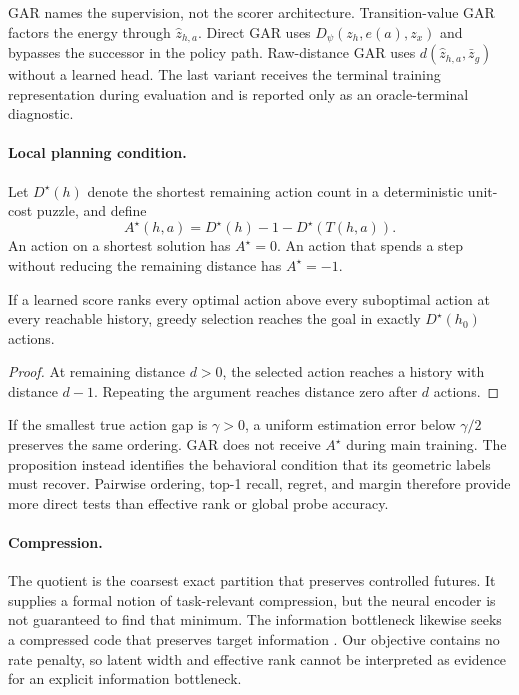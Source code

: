 GAR names the supervision, not the scorer architecture. Transition-value GAR factors the energy through $\widehat z_{h,a}$. Direct GAR uses $D_\psi(z_h,e(a),z_x)$ and bypasses the successor in the policy path. Raw-distance GAR uses $d(\widehat z_{h,a},\bar z_g)$ without a learned head. The last variant receives the terminal training representation during evaluation and is reported only as an oracle-terminal diagnostic.

\paragraph{Local planning condition.}
Let $D^\star(h)$ denote the shortest remaining action count in a deterministic unit-cost puzzle, and define
\begin{equation}
    A^\star(h,a)=D^\star(h)-1-D^\star(T(h,a)).
\end{equation}
An action on a shortest solution has $A^\star=0$. An action that spends a step without reducing the remaining distance has $A^\star=-1$.

\begin{proposition}
If a learned score ranks every optimal action above every suboptimal action at every reachable history, greedy selection reaches the goal in exactly $D^\star(h_0)$ actions.
\end{proposition}
\begin{proof}
At remaining distance $d>0$, the selected action reaches a history with distance $d-1$. Repeating the argument reaches distance zero after $d$ actions.
\end{proof}

If the smallest true action gap is $\gamma>0$, a uniform estimation error below $\gamma/2$ preserves the same ordering. GAR does not receive $A^\star$ during main training. The proposition instead identifies the behavioral condition that its geometric labels must recover. Pairwise ordering, top-1 recall, regret, and margin therefore provide more direct tests than effective rank or global probe accuracy.

\paragraph{Compression.}
The quotient is the coarsest exact partition that preserves controlled futures. It supplies a formal notion of task-relevant compression, but the neural encoder is not guaranteed to find that minimum. The information bottleneck likewise seeks a compressed code that preserves target information \citep{tishby2000information}. Our objective contains no rate penalty, so latent width and effective rank cannot be interpreted as evidence for an explicit information bottleneck.

